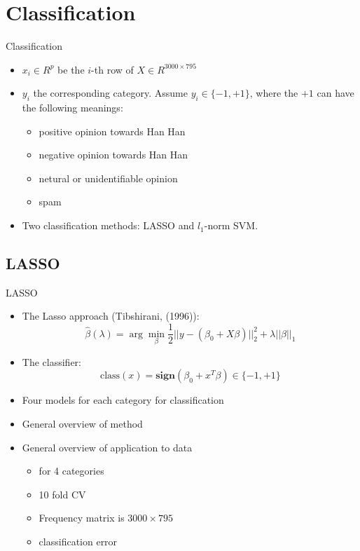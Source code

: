 \documentclass[12pt]{beamer}
\newcommand{\1}[1]{{\mathbf 1}\left\{#1\right\}}        %
\begin{document}
\clearpage 
\section{Classification}

\begin{frame}{Classification}


\begin{itemize}[<+->]


\item $x_i\in R^{p}$ be the $i$-th row of $X\in R^{3000\times795}$
\item $y_i$ the corresponding category. Assume $y_i\in\{-1,+1\}$, where the $+1$ can have the following meanings:
  \begin{itemize}[<+->]
    \item positive opinion towards Han Han
    \item negative opinion towards Han Han 
    \item netural or unidentifiable opinion 
    \item spam
\end{itemize}
\item Two classification methods: LASSO and $l_1$-norm SVM.
\end{itemize}
\end{frame}
\subsection{LASSO}

\begin{frame}[fragile]{LASSO}
\begin{itemize}[<+->]

\item The Lasso approach (Tibshirani, (1996)):
\[
\hat{\beta}(\lambda) = \arg \min_\beta \frac{1}{2}||y-(\beta_0+X\beta)||_2^2 + \lambda ||\beta||_1
\]
\item The classifier:
\[
\text{class}(x) = \textbf{sign}(\beta_0+x^T\beta)\in\{-1,+1\}
\]

\item Four models for each category for classification
\item General overview of method
\item General overview of application to data
	\begin{itemize}
	\item for 4 categories
	\item 10 fold CV
	\item Frequency matrix is $3000 \times 795$
	\item classification error
	\end{itemize}
	
\end{itemize}

\end{frame}
\end{document}

